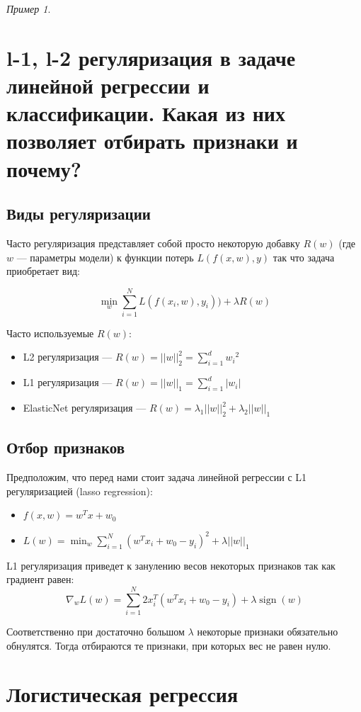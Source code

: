 \documentclass[a4paper, 12pt]{article}
\DeclareMathOperator{\sgn}{sign }
\theoremstyle{plain} %
\theoremstyle{definition} %
\theoremstyle{remark} %
\newtheorem{example}{Пример}
\begin{document}
\begin{example}
\section{l-1, l-2 регуляризация в задаче линейной регрессии и классификации. Какая из них позволяет отбирать признаки и почему?}

\subsection{Виды регуляризации}

Часто регуляризация представляет собой просто некоторую добавку $ R(w) $
 (где $ w $
 — параметры модели) к функции потерь $ L(f(x, w), y) $
 так что задача приобретает вид:

\[
	\min_{\displaystyle w} \sum_{i=1}^N L(f(x_i, w), y_i)) + \lambda R(w)
\]

Часто используемые $ R(w) $:
\begin{itemize}
	\item L2 регуляризация — $ R(w) = ||w||_2^2 = \sum_{i=1}^d {w_i}^2 $
	\item L1 регуляризация — $ R(w) = ||w||_1 = \sum_{i=1}^d |w_i| $
	\item ElasticNet регуляризация — $ R(w) = \lambda_1 ||w||_2^2 + \lambda_2 ||w||_1 $
\end{itemize}

\subsection{Отбор признаков}

Предположим, что перед нами стоит задача линейной регрессии с L1 регуляризацией (lasso regression):

\begin{itemize}
	\item $ f(x, w) = w^Tx + w_0 $
	\item $ L(w) = \min_{\displaystyle w} \sum_{i=1}^N (w^Tx_i + w_0 - y_i)^2 + \lambda ||w||_1 $
\end{itemize}

L1 регуляризация приведет к занулению весов некоторых признаков так как градиент равен:
\[
	\nabla_w L(w) = \sum_{i=1}^N 2x_i^T (w^Tx_i + w_0 - y_i) + \lambda \sgn(w)
\]

Соответственно при достаточно большом $ \lambda $
 некоторые признаки обязательно обнулятся. Тогда отбираются те признаки, при которых вес не равен нулю.

\section{Логистическая регрессия}


\end{example}
\end{document}
